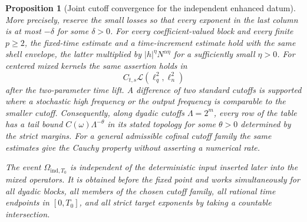\documentclass[10pt]{amsart}
\numberwithin{equation}{section}
\theoremstyle{plain}
\newtheorem{proposition}[theorem]{Proposition}
\theoremstyle{definition}
\theoremstyle{remark}
\begin{document}
\begin{proposition}[Joint cutoff convergence for the independent enhanced datum]
More precisely, reserve the small losses so that every exponent in the last column is at most $-\delta$ for some $\delta>0$.  For every coefficient-valued block and every finite $p\ge2$, the fixed-time estimate and a time-increment estimate hold with the same shell envelope, the latter multiplied by $|h|^\eta N^{\alpha\eta}$ for a sufficiently small $\eta>0$.  For centered mixed kernels the same assertion holds in
\[
 C_{t,s}\mathcal L(\ell_q^2,\ell_n^2)
\]
after the two-parameter time lift.  A difference of two standard cutoffs is supported where a stochastic high frequency or the output frequency is comparable to the smaller cutoff.  Consequently, along dyadic cutoffs $\Lambda=2^m$, every row of the table has a tail bound $C(\omega)\Lambda^{-\theta}$ in its stated topology for some $\theta>0$ determined by the strict margins.  For a general admissible cofinal cutoff family the same estimates give the Cauchy property without asserting a numerical rate.

The event $\Omega_{\mathrm{ind},T_0}$ is independent of the deterministic input inserted later into the mixed operators.  It is obtained before the fixed point and works simultaneously for all dyadic blocks, all members of the chosen cutoff family, all rational time endpoints in $[0,T_0]$, and all strict target exponents by taking a countable intersection.
\end{proposition}
\end{document}
